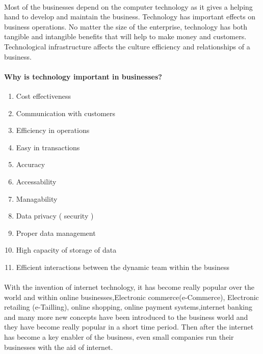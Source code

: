 \paragraph{}
Most of the businesses depend on the computer technology as it gives a helping hand to develop and maintain the business. Technology has important effects on business operations. No matter the size of the enterprise, technology has both tangible and intangible benefits that will help to make money and customers. Technological infrastructure affects the culture efficiency and relationships of a business.

\paragraph{Why is technology important in businesses?}
\begin{enumerate}
	\item Cost effectiveness
	\item Communication with customers
	\item Efficiency in operations
	\item Easy in transactions
	\item Accuracy
	\item Accessability
	\item Managability
	\item Data privacy ( security )
	\item Proper data management
	\item High capacity of storage of data
	\item Efficient interactions between the dynamic team within the business
\end{enumerate}

\paragraph{}
With the invention of internet technology, it has become really popular over the world and within online businesses,Electronic commerce(e-Commerce), Electronic retailing (e-Tailling), online shopping, online payment systems,internet banking and many more new concepts have been introduced to the business world and they have become really popular in a short time period. Then after the internet has become a key enabler of the business, even small companies run their businesses with the aid of internet. 

